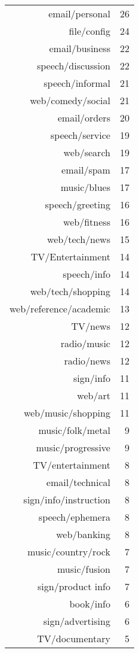 \begin{longtable}{rr}
      email/personal &  26 \\ 
      file/config &  24 \\ 
      email/business &  22 \\ 
      speech/discussion &  22 \\ 
      speech/informal &  21 \\ 
      web/comedy/social &  21 \\ 
      email/orders &  20 \\ 
      speech/service &  19 \\ 
      web/search &  19 \\ 
      email/spam &  17 \\ 
      music/blues &  17 \\ 
      speech/greeting &  16 \\ 
      web/fitness &  16 \\ 
      web/tech/news &  15 \\ 
      TV/Entertainment &  14 \\ 
      speech/info &  14 \\ 
      web/tech/shopping &  14 \\ 
      web/reference/academic &  13 \\ 
      TV/news &  12 \\ 
      radio/music &  12 \\ 
      radio/news &  12 \\ 
      sign/info &  11 \\ 
      web/art &  11 \\ 
      web/music/shopping &  11 \\ 
      music/folk/metal &   9 \\ 
      music/progressive &   9 \\ 
      TV/entertainment &   8 \\ 
      email/technical &   8 \\ 
      sign/info/instruction &   8 \\ 
      speech/ephemera &   8 \\ 
      web/banking &   8 \\ 
      music/country/rock &   7 \\ 
      music/fusion &   7 \\ 
      sign/product info &   7 \\ 
      book/info &   6 \\ 
      sign/advertising &   6 \\ 
      TV/documentary &   5 \\ 

\end{longtable}
